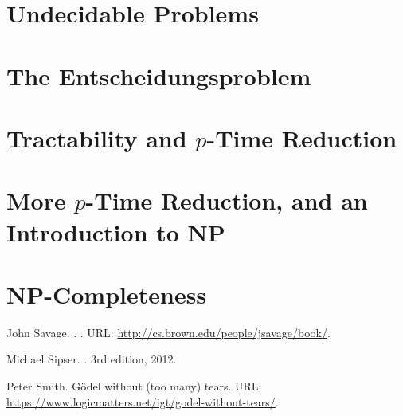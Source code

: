 \documentclass{article}
\theoremstyle{plain}
\newcommand{\NP}{\mathbf{NP}}
\begin{document}
\section*{Undecidable Problems}
\setcounter{section}{5}
\setcounter{Q}{0}


\section*{The Entscheidungsproblem}
\setcounter{section}{6}
\setcounter{Q}{0}


\section*{Tractability and $p$-Time Reduction}
\setcounter{section}{7}
\setcounter{Q}{0}


\section*{More $p$-Time Reduction, and an Introduction to $\NP$}
\setcounter{section}{8}
\setcounter{Q}{0}

\section*{$\NP$-Completeness}
\setcounter{Q}{0}



\begin{thebibliography}{1}

John Savage.
.
.
\newblock URL: \url{http://cs.brown.edu/people/jsavage/book/}.

Michael Sipser.
.
\newblock 3rd edition, 2012.

Peter Smith.
\newblock G\"odel without (too many) tears.
\newblock URL: \url{https://www.logicmatters.net/igt/godel-without-tears/}.

\end{thebibliography}


\end{document}
